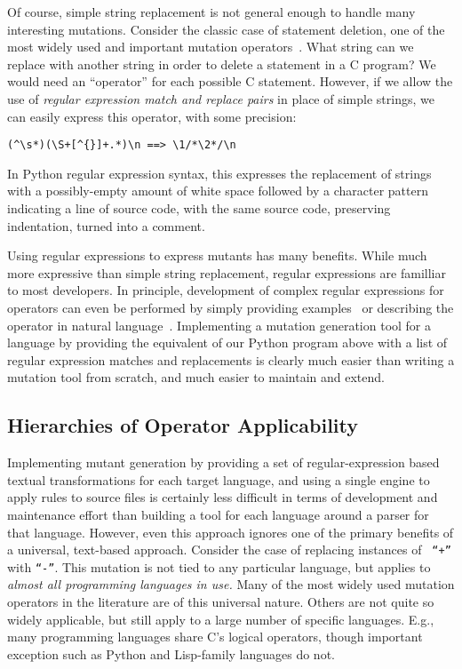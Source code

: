 \documentclass[sigconf,review, anonymous]{acmart}
\begin{document}
Of course, simple string replacement is not general enough to handle
many interesting mutations.  Consider the classic case of statement
deletion, one of the most widely used and important mutation
operators~\cite{deng2013empirical}.  What string can we replace with another string in order to
delete a statement in a C program?  We would need an ``operator'' for
each possible C statement.  However, if we allow the use of
\emph{regular expression match and replace pairs} in place of simple
strings, we can easily express this operator, with some precision:

\begin{verbatim}
(^\s*)(\S+[^{}]+.*)\n ==> \1/*\2*/\n
\end{verbatim}

In Python regular expression syntax, this expresses the replacement of
strings with a possibly-empty amount of white space followed by a
character pattern indicating a line of source code, with the same
source code, preserving indentation, turned into a comment.

Using regular expressions to express mutants has many benefits.  While
much more expressive than simple string replacement, regular
expressions are familliar to most developers.  In principle,
development of complex regular expressions for operators can even be
performed by simply providing examples~\cite{bartoli2014automatic}  or
describing the operator in natural
language~\cite{zhong2018generating}.  Implementing a mutation
generation tool for a language by providing the equivalent of our
Python program above with a list of regular expression matches and
replacements is clearly much easier than writing a mutation tool from
scratch, and much easier to maintain and extend. 

\subsection{Hierarchies of Operator Applicability}

Implementing mutant generation by providing a set of regular-expression
based textual transformations for each target language, and using a
single engine to apply rules to source files is certainly less
difficult in terms of development and maintenance effort than building
a tool for each language around a parser for that language.  However,
even this approach ignores one of the primary benefits of a universal,
text-based approach.  Consider the case of replacing instances of {\tt
  ``+''}  with {\tt ``-''}.  This mutation is not tied to any
particular language, but applies to \emph{almost all programming
  languages in use.}  Many of the most widely used mutation operators
in the literature are of this universal nature.  Others are not quite
so widely applicable, but still apply to a large number of specific
languages.  E.g., many programming languages share C's logical
operators, though important exception such as Python and Lisp-family
languages do not.
\end{document}
